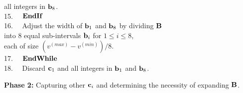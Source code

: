 \documentclass[lettersize,journal]{IEEEtran}
\begin{document}
\begin{tabbing}
     \>               \>            \> all integers in ${\bf b}_{8}$. \\
15.~~\>               \> ${\bf EndIf}$ \\
16.~~\>               \> Adjust the width of ${\bf b}_{1}$ and ${\bf b}_{8}$ by dividing ${\bf B}$ \\
     \>               \> into 8 equal sub-intervals ${\bf b}_{i}$ for $1 \leq i \leq 8$, \\
     \>               \> each of size $(v^{(max)} - v^{(min)})/8$. \\
17.~~\> ${\bf EndWhile}$ \\
18.~~\> Discard ${\bf c}_{1}$ and all integers in ${\bf b}_{1}$ and ${\bf b}_{8}$.
\end{tabbing}

\vspace{0.2in}
\noindent
{\bf Phase 2:} Capturing other ${\bf c}_{i}$ and determining the necessity of expanding ${\bf B}$.
\end{document}
